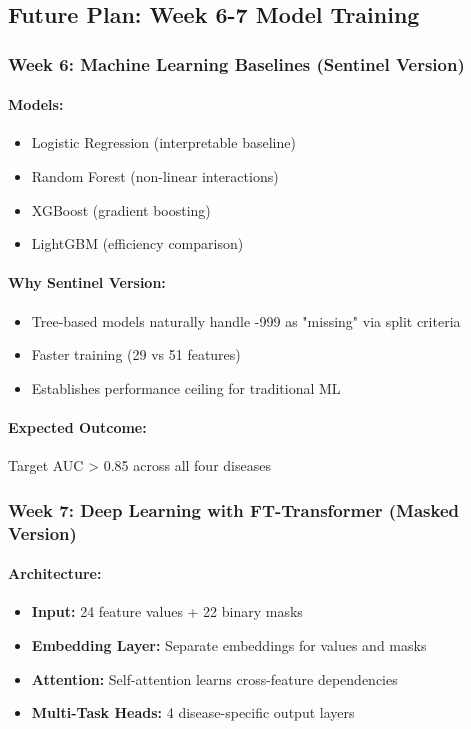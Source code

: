 \documentclass[12pt,a4paper]{article}
\begin{document}
\subsection{Future Plan: Week 6-7 Model Training}

\subsubsection{Week 6: Machine Learning Baselines (Sentinel Version)}

\paragraph{Models:}
\begin{itemize}
    \item Logistic Regression (interpretable baseline)
    \item Random Forest (non-linear interactions)
    \item XGBoost (gradient boosting)
    \item LightGBM (efficiency comparison)
\end{itemize}

\paragraph{Why Sentinel Version:}
\begin{itemize}
    \item Tree-based models naturally handle -999 as "missing" via split criteria
    \item Faster training (29 vs 51 features)
    \item Establishes performance ceiling for traditional ML
\end{itemize}

\paragraph{Expected Outcome:}
Target AUC > 0.85 across all four diseases

\subsubsection{Week 7: Deep Learning with FT-Transformer (Masked Version)}

\paragraph{Architecture:}
\begin{itemize}
    \item \textbf{Input:} 24 feature values + 22 binary masks
    \item \textbf{Embedding Layer:} Separate embeddings for values and masks
    \item \textbf{Attention:} Self-attention learns cross-feature dependencies
    \item \textbf{Multi-Task Heads:} 4 disease-specific output layers
\end{itemize}
\end{document}
